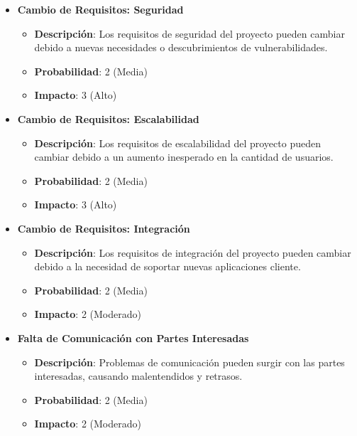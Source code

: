 \begin{itemize}
    \item \textbf{Cambio de Requisitos: Seguridad}
          \begin{itemize}
              \item \textbf{Descripción}: Los requisitos de seguridad del proyecto pueden cambiar debido a nuevas necesidades o descubrimientos de vulnerabilidades.
              \item \textbf{Probabilidad}: 2 (Media)
              \item \textbf{Impacto}: 3 (Alto)
          \end{itemize}

    \item \textbf{Cambio de Requisitos: Escalabilidad}
          \begin{itemize}
              \item \textbf{Descripción}: Los requisitos de escalabilidad del proyecto pueden cambiar debido a un aumento inesperado en la cantidad de usuarios.
              \item \textbf{Probabilidad}: 2 (Media)
              \item \textbf{Impacto}: 3 (Alto)
          \end{itemize}

    \item \textbf{Cambio de Requisitos: Integración}
          \begin{itemize}
              \item \textbf{Descripción}: Los requisitos de integración del proyecto pueden cambiar debido a la necesidad de soportar nuevas aplicaciones cliente.
              \item \textbf{Probabilidad}: 2 (Media)
              \item \textbf{Impacto}: 2 (Moderado)
          \end{itemize}

    \item \textbf{Falta de Comunicación con Partes Interesadas}
          \begin{itemize}
              \item \textbf{Descripción}: Problemas de comunicación pueden surgir con las partes interesadas, causando malentendidos y retrasos.
              \item \textbf{Probabilidad}: 2 (Media)
              \item \textbf{Impacto}: 2 (Moderado)
          \end{itemize}


\end{itemize}
